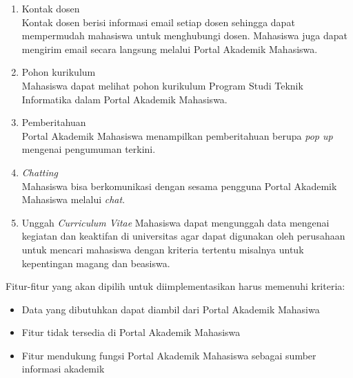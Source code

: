 \begin{enumerate}
	\item Kontak dosen\\
	Kontak dosen berisi informasi email setiap dosen sehingga dapat mempermudah mahasiswa untuk menghubungi dosen. Mahasiswa juga dapat mengirim email secara langsung melalui Portal Akademik Mahasiswa.
	\item Pohon kurikulum\\
	Mahasiswa dapat melihat pohon kurikulum Program Studi Teknik Informatika dalam Portal Akademik Mahasiswa.
	\item Pemberitahuan\\
	Portal Akademik Mahasiswa menampilkan pemberitahuan berupa \textit{pop up} mengenai pengumuman terkini.
	\item \textit{Chatting}\\
	Mahasiswa bisa berkomunikasi dengan sesama pengguna Portal Akademik Mahasiswa melalui \textit{chat}.
	\item Unggah \textit{Curriculum Vitae}
	Mahasiswa dapat mengunggah data mengenai kegiatan dan keaktifan di universitas agar dapat digunakan oleh perusahaan untuk mencari mahasiswa dengan kriteria tertentu misalnya untuk kepentingan magang dan beasiswa.
\end{enumerate}

Fitur-fitur yang akan dipilih untuk diimplementasikan harus memenuhi kriteria:
\begin{itemize}
	\item Data yang dibutuhkan dapat diambil dari Portal Akademik Mahasiwa
	\item Fitur tidak tersedia di Portal Akademik Mahasiswa
	\item Fitur mendukung fungsi Portal Akademik Mahasiswa sebagai sumber informasi akademik
\end{itemize}


